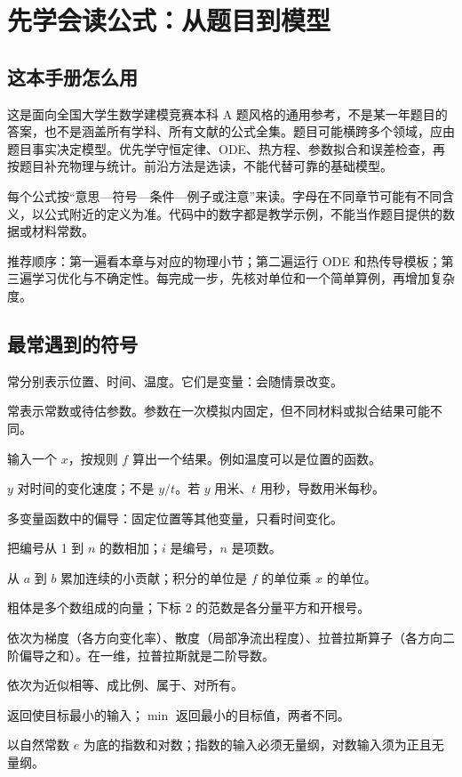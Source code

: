\chapter{先学会读公式：从题目到模型}
\section{这本手册怎么用}
这是面向全国大学生数学建模竞赛本科 A 题风格的通用参考，不是某一年题目的答案，也不是涵盖所有学科、所有文献的公式全集。题目可能横跨多个领域，应由题目事实决定模型。优先学守恒定律、ODE、热方程、参数拟合和误差检查，再按题目补充物理与统计。前沿方法是选读，不能代替可靠的基础模型。

每个公式按“意思—符号—条件—例子或注意”来读。字母在不同章节可能有不同含义，以公式附近的定义为准。代码中的数字都是教学示例，不能当作题目提供的数据或材料常数。

推荐顺序：第一遍看本章与对应的物理小节；第二遍运行 ODE 和热传导模板；第三遍学习优化与不确定性。每完成一步，先核对单位和一个简单算例，再增加复杂度。

\section{最常遇到的符号}
\begin{description}[style=nextline]
\item[$x,t,T$] 常分别表示位置、时间、温度。它们是变量：会随情景改变。
\item[$a,k,\theta$] 常表示常数或待估参数。参数在一次模拟内固定，但不同材料或拟合结果可能不同。
\item[$f(x)$] 输入一个 $x$，按规则 $f$ 算出一个结果。例如温度可以是位置的函数。
\item[$\mathrm{d}y/\mathrm{d}t$] $y$ 对时间的变化速度；不是 $y/t$。若 $y$ 用米、$t$ 用秒，导数用米每秒。
\item[$\partial T/\partial t$] 多变量函数中的偏导：固定位置等其他变量，只看时间变化。
\item[$\sum_{i=1}^{n}a_i$] 把编号从 1 到 $n$ 的数相加；$i$ 是编号，$n$ 是项数。
\item[$\int_a^b f(x)\,\mathrm{d}x$] 从 $a$ 到 $b$ 累加连续的小贡献；积分的单位是 $f$ 的单位乘 $x$ 的单位。
\item[$\boldsymbol{x},\|\boldsymbol{x}\|_2$] 粗体是多个数组成的向量；下标 2 的范数是各分量平方和开根号。
\item[$\nabla f,\nabla\cdot\boldsymbol{v},\nabla^2 f$] 依次为梯度（各方向变化率）、散度（局部净流出程度）、拉普拉斯算子（各方向二阶偏导之和）。在一维，拉普拉斯就是二阶导数。
\item[$\approx,\propto,\in,\forall$] 依次为近似相等、成比例、属于、对所有。
\item[$\arg\min$] 返回使目标最小的输入；$\min$ 返回最小的目标值，两者不同。
\item[$\exp(z),\ln z$] 以自然常数 $e$ 为底的指数和对数；指数的输入必须无量纲，对数输入须为正且无量纲。
\end{description}


